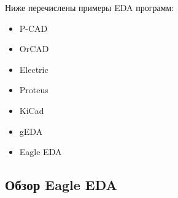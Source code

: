 \begin{par}
Ниже перечислены примеры EDA программ:
	\begin{itemize}
		\item{}P-CAD
		\item{}OrCAD
		\item{}Electric
		\item{}Proteus
		\item{}KiCad
		\item{}gEDA
		\item{}Eagle EDA
	\end{itemize}
\end{par}


\subsection{Обзор Eagle EDA}
